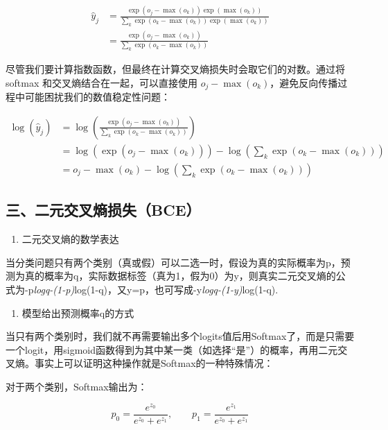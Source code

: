 \[
\begin{aligned}
\hat{y}_j
&=\frac{\exp(o_j-\max(o_k))\exp(\max(o_k))}
{\sum_k\exp(o_k-\max(o_k))\exp(\max(o_k))}\\
&=\frac{\exp(o_j-\max(o_k))}
{\sum_k\exp(o_k-\max(o_k))}
\end{aligned}
\]

尽管我们要计算指数函数，但最终在计算交叉熵损失时会取它们的对数。通过将 softmax 和交叉熵结合在一起，可以直接使用 \(o_j-\max(o_k)\)，避免反向传播过程中可能困扰我们的数值稳定性问题：

\[
\begin{aligned}
\log(\hat{y}_j)
&=\log\left(\frac{\exp(o_j-\max(o_k))}
{\sum_k\exp(o_k-\max(o_k))}\right)\\
&=\log(\exp(o_j-\max(o_k)))
-\log\left(\sum_k\exp(o_k-\max(o_k))\right)\\
&=o_j-\max(o_k)-\log\left(\sum_k\exp(o_k-\max(o_k))\right)
\end{aligned}
\]

\hypertarget{ux4e09ux4e8cux5143ux4ea4ux53c9ux71b5ux635fux5931bce}{%
\subsection{三、二元交叉熵损失（BCE）}\label{ux4e09ux4e8cux5143ux4ea4ux53c9ux71b5ux635fux5931bce}}

\begin{enumerate}
\def\labelenumi{\arabic{enumi}.}
\tightlist
\item
  二元交叉熵的数学表达
\end{enumerate}

当分类问题只有两个类别（真或假）可以二选一时，假设为真的实际概率为p，预测为真的概率为q，实际数据标签（真为1，假为0）为y，则真实二元交叉熵的公式为-p\emph{logq-(1-p)}log(1-q)，又y=p，也可写成-y\emph{logq-(1-y)}log(1-q).

\begin{enumerate}
\def\labelenumi{\arabic{enumi}.}
\setcounter{enumi}{1}
\tightlist
\item
  模型给出预测概率q的方式
\end{enumerate}

当只有两个类别时，我们就不再需要输出多个logits值后用Softmax了，而是只需要一个logit，用sigmoid函数得到为其中某一类（如选择``是''）的概率，再用二元交叉熵。事实上可以证明这种操作就是Softmax的一种特殊情况：

对于两个类别，Softmax输出为：

\[
p_0=\frac{e^{z_0}}{e^{z_0}+e^{z_1}},\qquad
p_1=\frac{e^{z_1}}{e^{z_0}+e^{z_1}}
\]

